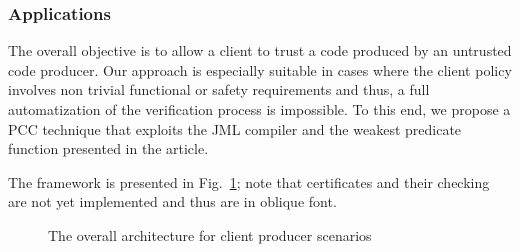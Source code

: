 
\subsubsection{Applications}
\label{architecture_s}  


The overall objective is to allow a client to trust a code produced by an untrusted code producer. Our approach is especially suitable
 in cases where the client policy involves non trivial functional or safety requirements and thus, a full automatization of the verification 
process is impossible. To this end, we propose a PCC technique that exploits the JML compiler and the weakest predicate function presented in the article. 
 
 The framework is presented in Fig.~\ref{architecture}; note that certificates and their checking are not yet implemented
 and thus are in oblique font.
  


 \begin{figure}[!tbp]
 \centering
{}
\caption{\sc The overall architecture for client producer scenarios }
\label{architecture}
\end{figure}

